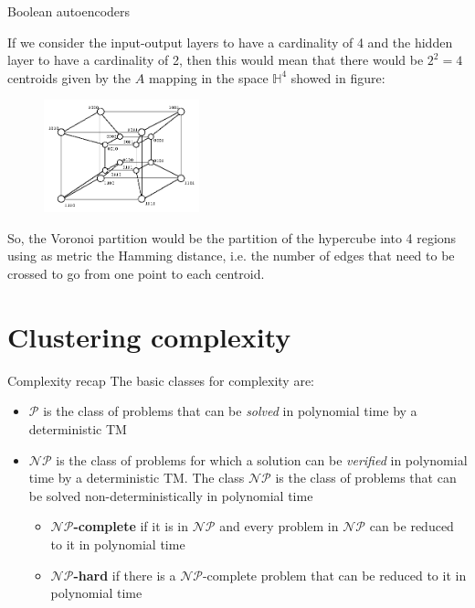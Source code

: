 \documentclass{beamer}
\begin{document}
\begin{frame}{Boolean autoencoders}
    \begin{multicols}{2}
        If we consider the input-output layers to have a cardinality of 4 and the hidden layer to have a cardinality of 2, then this would mean that there would be $2^2 = 4$ centroids given by the $A$ mapping in the space $\mathbb{H}^4$ showed in figure:

        \begin{figure}[H]
            \centering
            \includegraphics[width=0.4\textwidth]{./Images/Hypercube4Dimensions.png}
        \end{figure}
    \end{multicols}
    So, the Voronoi partition would be the partition of the hypercube into 4 regions using as metric the Hamming distance, i.e. the number of edges that need to be crossed to go from one point to each centroid.

\end{frame}

\section{Clustering complexity}
\begin{frame}{Complexity recap}
The basic classes for complexity are:
\begin{itemize}
    \item $\mathcal{P}$ is the class of problems that can be \textit{solved} in polynomial time by a deterministic TM
    \item $\mathcal{NP}$ is the class of problems for which a solution can be \textit{verified} in polynomial time by a deterministic TM. The class $\mathcal{NP}$ is the class of problems that can be solved non-deterministically in polynomial time
    \begin{itemize}
        \item \textbf{$\mathcal{NP}$-complete} if it is in $\mathcal{NP}$ and every problem in $\mathcal{NP}$ can be reduced to it in polynomial time
        \item \textbf{$\mathcal{NP}$-hard} if there is a $\mathcal{NP}$-complete problem that can be reduced to it in polynomial time
    \end{itemize}
\end{itemize}
\end{frame}
\end{document}
